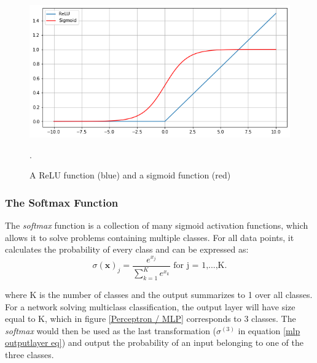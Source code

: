             \begin{figure}[H]
                \centering
                \includegraphics[scale=0.5]{figures/activation.png}
                \caption[ReLu and sigmoid]{A ReLU function (blue) and a sigmoid function (red)}.
              	\medskip 
                \label{activation_fig}
            \end{figure}

    \subsubsection{The Softmax Function}
        The \textit{softmax} function is a collection of many sigmoid activation functions, which allows it to solve problems containing multiple classes\cite{sharma2019new_activation_func}. For all data points, it calculates the probability of every class and can be expressed as:
        \begin{equation}
            \sigma(\textbf{x})_{j} = \dfrac{e^{x_{j}}}{\sum^{K}_{k=1}e^{x_{k}}} \textrm{ for j = 1,...,K.}
        \end{equation}
        
        where K is the number of classes and the output summarizes to 1 over all classes. For a network solving multiclass classification, the output layer will have size equal to K, which in figure \ref{Perceptron / MLP} corresponds to 3 classes. The \textit{softmax} would then be used as the last transformation ($\sigma^{(3)}$ in equation \ref{mlp outputlayer eq}) and output the probability of an input belonging to one of the three classes.
        

